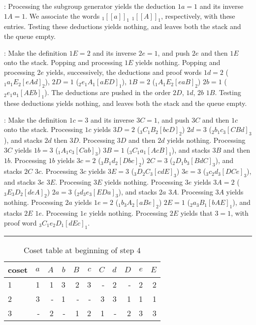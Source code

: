 :
Processing the subgroup generator yields the deduction $1a=1$ and its
  inverse $1A=1$.
We associate the words $_1[[a]]_1$ \amp $_1[[A]]_1$, respectively, with
  these entries.
Testing these deductions yields nothing, and leaves both the stack and the
  queue empty.

:
Make the definition $1E=2$ and its inverse $2e=1$, and push $2e$ and then
  $1E$ onto the stack.
Popping and processing $1E$ yields nothing.
Popping and processing $2e$ yields, successively, the deductions and
  proof words $1d=2$ ($_1a_1E_2[eAd]_2$), $2D=1$ ($_2e_1A_1[aED]_1$),
  $1B=2$ ($_1A_1E_2[eaB]_2$) \amp $2b=1$ ($_2e_1a_1[AEb]_1$).
The deductions are pushed in the order $2D$, $1d$, $2b$ \amp $1B$.
Testing these deductions yields nothing, and leaves both the stack and the
  queue empty.

:
Make the definition $1c=3$ and its inverse $3C=1$, and push $3C$ and then
  $1c$ onto the stack.
Processing $1c$ yields $3D=2$ ($_3C_1B_2[bcD]_2$) \amp $2d=3$
  ($_2b_1c_3[CBd]_3$), and stacks $2d$ then $3D$.
Processing $3D$ and then $2d$ yields nothing.
Processing $3C$ yields $1b=3$ ($_1A_1c_3[Cab]_3$) \amp $3B=1$
  ($_3C_1a_1[AcB]_1$), and stacks $3B$ and then $1b$.
Processing $1b$ yields $3c=2$ ($_3B_1d_2[Dbc]_2$) \amp $2C=3$
  ($_2D_1b_3[BdC]_3$), and stacks $2C$ \amp $3c$.
Processing $3c$ yields $3E=3$ ($_3D_2C_3[cdE]_3$) \amp $3e=3$
  ($_3c_2d_3[DCe]_3$), and stacks $3e$ \amp $3E$.
Processing $3E$ yields nothing.
Processing $3e$ yields $3A=2$ ($_3E_3D_2[deA]_2$) \amp $2a=3$
  ($_2d_3e_3[EDa]_3$), and stacks $2a$ \amp $3A$.
Processing $3A$ yields nothing.
Processing $2a$ yields $1e=2$ ($_1b_3A_2[aBe]_2$) \amp $2E=1$
  ($_2a_3B_1[bAE]_1$), and stacks $2E$ \amp $1e$.
Processing $1e$ yields nothing.
Processing $2E$ yields that $3=1$, with proof word $_3C_1e_2D_1[dEc]_1$.

\begin{table}
\hrule
\caption{Coset table at beginning of step $4$}
\label{tab:step4}
\smallskip
\renewcommand{\arraystretch}{0.875}
\begin{tabular*}{\textwidth}{@{\extracolsep{\fill}}lrrrrrrrrrr} 
\hline\hline
coset & $a$ & $A$ & $b$ & $B$ & $c$ & $C$ & $d$ & $D$ & $e$ & $E$ \\ 
\hline
 1 & 1 & 1 & 3 & 2 & 3 & - & 2 & - & 2 & 2 \\
 2 & 3 & - & 1 & - & - & 3 & 3 & 1 & 1 & 1 \\
 3 & - & 2 & - & 1 & 2 & 1 & - & 2 & 3 & 3 \\
\hline\hline
\end{tabular*}
\end{table}

